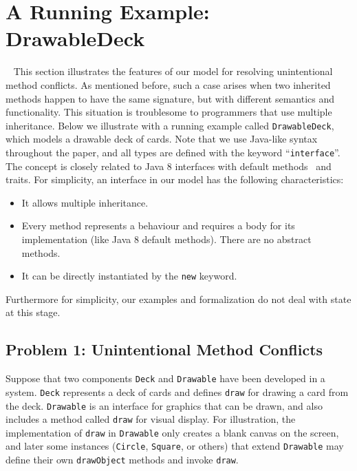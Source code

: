 \section{A Running Example: DrawableDeck}~\label{sec:overview}
This section illustrates the features of our model for
resolving unintentional method conflicts. As mentioned before, such a
case arises when two inherited methods happen to have the same
signature, but with different semantics and functionality. This
situation is troublesome to programmers that use multiple
inheritance. Below we illustrate with a running example called
\lstinline|DrawableDeck|, which models a drawable deck of cards. 
Note that we use Java-like syntax
throughout the paper, and all types are defined with the keyword
``\lstinline|interface|''. The concept is closely related to Java 8
interfaces with default methods~\cite{bono14} and traits. For simplicity, an interface in our model has
the following characteristics:
\begin{itemize}
  \item It allows multiple inheritance.
  \item Every method represents a behaviour and requires a body for its implementation (like Java 8 default methods). There are no abstract methods.
  \item It can be directly instantiated by the \lstinline|new| keyword.
\end{itemize}
Furthermore for simplicity, our examples and formalization do not deal with state at
this stage. %

\subsection{Problem 1: Unintentional Method Conflicts}
Suppose that two components \lstinline|Deck| and \lstinline|Drawable| 
have been developed in a system.  \lstinline|Deck| represents a deck
of cards and defines \lstinline|draw| for drawing a card from the
deck.  \lstinline|Drawable| is an interface for graphics that
can be drawn, and also includes a method called \lstinline|draw| for
visual display. For illustration, the implementation of
\lstinline|draw| in \lstinline|Drawable| only creates a blank canvas
on the screen, and later some instances (\lstinline|Circle|,
\lstinline|Square|, or others) that extend \lstinline|Drawable| may
define their own \lstinline|drawObject| methods and invoke
\lstinline|draw|.

